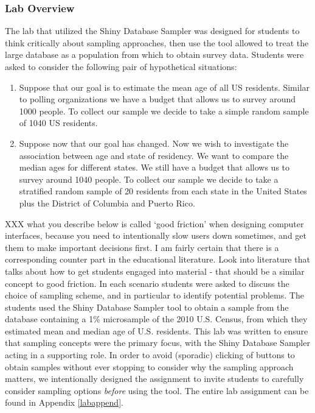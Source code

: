 \documentclass{article}\usepackage[]{graphicx}\usepackage[]{color}
\newcommand{\hh}[1]{{\color{ForestGreen} #1}}
\begin{document}
 \subsubsection{Lab Overview} 

The lab that utilized the Shiny Database Sampler was designed for students to think critically about sampling approaches, then use the tool allowed to treat the large database as 
a population from which to obtain survey data. Students were asked to consider the following pair of hypothetical situations:

\begin{enumerate}
\item Suppose that our goal is to estimate the mean age of all US residents. Similar to polling organizations we have a budget that allows us to survey around 1000 people. To collect our sample we decide to take a simple random sample of 1040 US residents.

\item Suppose now that our goal has changed.  Now we wish to investigate the association between age and state of residency. We want to compare the median ages for different states. We still have a budget that allows us to survey around 1040 people. To collect our sample we decide to take a stratified random sample of 20 residents from each state in the United States plus the District of Columbia and Puerto Rico. 
\end{enumerate}

\hh{XXX what you describe below is called `good friction' when designing computer interfaces, because you need to intentionally slow users down sometimes, and get them to make important decisions first. I am fairly certain that there is a corresponding counter part in the educational literature. Look into literature that talks about how to get students engaged into material - that should be a similar concept to good friction.
}
In each scenario students were asked to discuss the choice of sampling scheme, and in particular to identify potential problems. The students used the Shiny Database Sampler tool to obtain a sample from the database containing a 1\% microsample of the 2010 U.S. Census, from which they estimated mean and median age of U.S. residents. This lab was written to ensure that sampling concepts were the primary focus, with the Shiny Database Sampler acting in a supporting role. In order to avoid (sporadic) clicking of buttons to obtain samples without ever stopping to consider why the sampling approach matters, we intentionally designed the assignment to invite students to carefully consider sampling options {\it before} using the tool. The entire lab assignment can be found in Appendix \ref{labappend}. 
\end{document}
